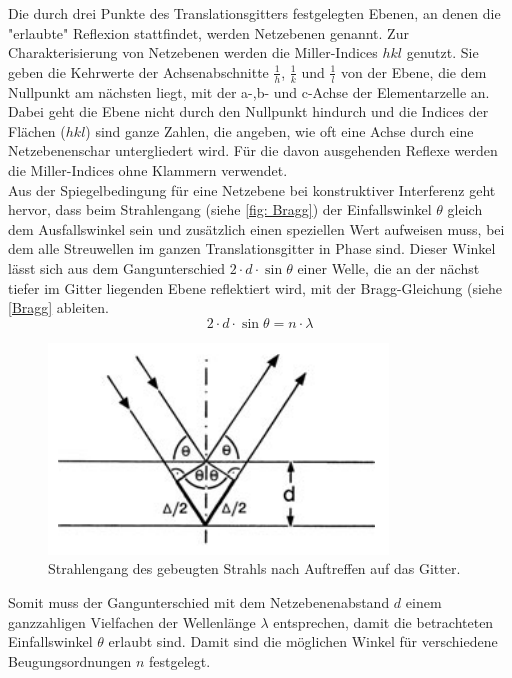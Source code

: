 \documentclass[a4paper,12pt,bibliography=totocnumbered]{scrartcl}
\begin{document}
Die durch drei Punkte des Translationsgitters festgelegten Ebenen, an denen die "erlaubte" Reflexion stattfindet, werden Netzebenen genannt. Zur Charakterisierung von Netzebenen werden die Miller-Indices $hkl$ genutzt. Sie geben die Kehrwerte der Achsenabschnitte $\frac{1}{h}$, $\frac{1}{k}$ und $\frac{1}{l}$ von der Ebene, die dem Nullpunkt am nächsten liegt, mit der a-,b- und c-Achse der Elementarzelle an. Dabei geht die Ebene nicht durch den Nullpunkt hindurch und die Indices der Flächen ($hkl$) sind ganze Zahlen, die angeben, wie oft eine Achse durch eine Netzebenenschar untergliedert wird. Für die davon ausgehenden Reflexe werden die Miller-Indices ohne Klammern verwendet. \\
Aus der Spiegelbedingung für eine Netzebene bei konstruktiver Interferenz geht hervor, dass beim Strahlengang (siehe \autoref{fig: Bragg}) der Einfallswinkel $\theta$ gleich dem Ausfallswinkel sein und zusätzlich einen speziellen Wert aufweisen muss, bei dem alle Streuwellen im ganzen Translationsgitter in Phase sind. Dieser Winkel lässt sich aus dem Gangunterschied $2 \cdot d \cdot \sin \theta$ einer Welle, die an der nächst tiefer im Gitter liegenden Ebene reflektiert wird, mit der Bragg-Gleichung (siehe \autoref{Bragg} ableiten. 
\begin{equation}
    2 \cdot d \cdot \sin \theta = n \cdot \lambda
    \label{Bragg}
\end{equation}

\begin{figure}[H]
    \centering
    \includegraphics[scale=0.95]{Bilder/Bragg.png}
    \caption{Strahlengang des gebeugten Strahls nach Auftreffen auf das Gitter. \cite{Kristallgitter}}
    \label{fig: Bragg}
\end{figure}
Somit muss der Gangunterschied mit dem Netzebenenabstand $d$ einem  ganzzahligen Vielfachen der Wellenlänge $\lambda$ entsprechen, damit die betrachteten Einfallswinkel $\theta$ erlaubt sind.
Damit sind die möglichen Winkel für verschiedene Beugungsordnungen $n$ festgelegt.
\end{document}
